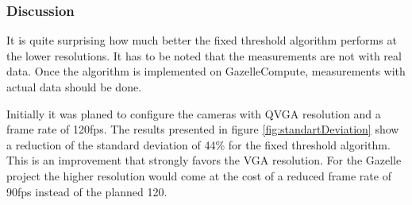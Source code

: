 \subsubsection{Discussion}
It is quite surprising how much better the fixed threshold algorithm performs at the lower resolutions. It has to be noted that the measurements are not with real data. Once the algorithm is implemented on GazelleCompute, measurements with actual data should be done.

Initially it was planed to configure the cameras with \gls{QVGA} resolution and a frame rate of 120fps. The results presented in figure \ref{fig:standartDeviation} show a reduction of the standard deviation of 44\% for the fixed threshold algorithm. This is an improvement that strongly favors the VGA resolution. For the Gazelle project the higher resolution would come at the cost of a reduced frame rate of 90fps instead of the planned 120.